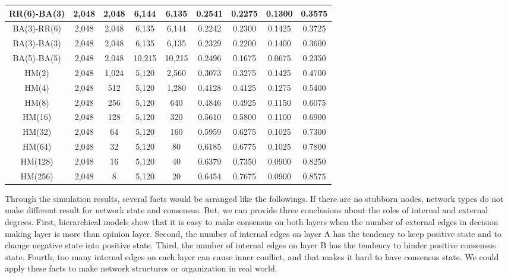 \begin{table}[!htb]
\begin{center}
\begin{tabular}{c|c|c|c|c|c|c|c|c}
			RR(6)-BA(3)            & 2,048 	& 2,048   & 6,144   & 6,135   &  0.2541   & 0.2275 & 0.1300 & 0.3575   \\ \hline 
			BA(3)-RR(6)            & 2,048 	& 2,048   & 6,135   & 6,144   &  0.2242   & 0.2300 & 0.1425 & 0.3725   \\ \hline
			BA(3)-BA(3)            & 2,048 	& 2,048   & 6,135   & 6,135   &  0.2329   & 0.2200 & 0.1400 & 0.3600   \\ \hline
			BA(5)-BA(5)            & 2,048 	& 2,048   & 10,215  & 10,215  &  0.2496   & 0.1675 & 0.0675 & 0.2350   \\ \hline
			HM(2)  				   & 2,048 	& 1,024   & 5,120   & 2,560   &  0.3073   & 0.3275 & 0.1425 & 0.4700   \\ \hline    
			HM(4) 				   & 2,048 	&  512    & 5,120   & 1,280   &  0.4128   & 0.4125 & 0.1275 & 0.5400   \\ \hline
			HM(8)  				   & 2,048 	&  256    & 5,120   & 640     &  0.4846   & 0.4925 & 0.1150 & 0.6075   \\ \hline
			HM(16)				   & 2,048 	&  128    & 5,120   & 320     &  0.5610   & 0.5800 & 0.1100 & 0.6900   \\ \hline
			HM(32) 				   & 2,048 	&   64    & 5,120   & 160     &  0.5959   & 0.6275 & 0.1025 & 0.7300   \\ \hline
			HM(64) 				   & 2,048 	&   32    & 5,120   & 80      &  0.6185   & 0.6775 & 0.1025 & 0.7800   \\ \hline 
			HM(128) 			   & 2,048 	&   16    & 5,120   & 40      &  0.6379   & 0.7350 & 0.0900 & 0.8250   \\ \hline 
			HM(256) 			   & 2,048 	&    8    & 5,120   & 20      &  0.6454   & 0.7675 & 0.0900 & 0.8575   \\ \hline 
			 \hline
		\end{tabular}
	\end{center}
\end{table} 
Through the simulation results, several facts would be arranged like the followings. If there are no stubborn nodes, network types do not make different result for network state and consensus. But, we can provide three conclusions about the roles of internal and external degrees. First, hierarchical models show that it is easy to make consensus on both layers when the number of external edges in decision making layer is more than opinion layer. Second, the number of internal edges on layer A has the tendency to keep positive state and to change negative state into positive state. Third, the number of internal edges on layer B has the tendency to hinder positive consensus state. Fourth, too many internal edges on each layer can cause inner conflict, and that makes it hard to have consensus state. We could apply these facts to make network structures or organization in real world. 